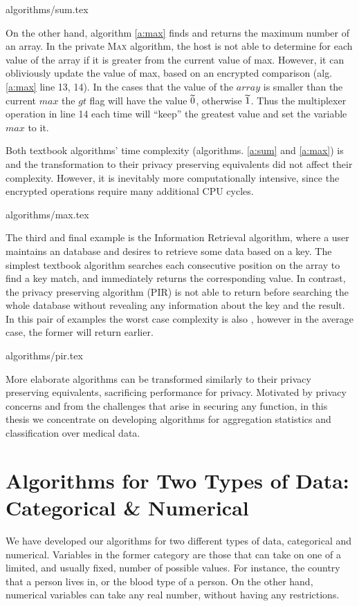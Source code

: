 {algorithms/sum.tex}


On the other hand, algorithm \ref{a:max} finds and returns the maximum number of an array.
In the private {\textsc{Max}} algorithm, the host is not able to determine for each value of the array if it is greater from the current value of max.
However, it can obliviously update the value of max, based on an encrypted comparison (alg. \ref{a:max} line 13, 14).
In the cases that the value of the $array$ is smaller than the current $max$ the $gt$ flag will have the value $\widetilde{0}$, otherwise $\widetilde{1}$.
Thus the multiplexer operation in line 14 each time will ``keep'' the greatest value and set the variable $max$ to it.

Both textbook algorithms' time complexity (algorithms. \ref{a:sum} and \ref{a:max}) is  and the transformation to their privacy preserving equivalents did not affect their complexity.
However, it is inevitably more computationally intensive, since the encrypted operations require many additional CPU cycles.

{algorithms/max.tex}


The third and final example is the Information Retrieval algorithm, where a user maintains an database and desires to retrieve some data based on a key.
The simplest textbook algorithm searches each consecutive position on the array to find a key match, and immediately returns the corresponding value.
In contrast, the privacy preserving algorithm (PIR) is not able to return before searching the whole database without revealing any information about the key and the result.
In this pair of examples the worst case complexity is also , however in the average case, the former will return earlier.


{algorithms/pir.tex}


More elaborate algorithms can be transformed similarly to their privacy preserving equivalents, sacrificing performance for privacy.
Motivated by privacy concerns and from the challenges that arise in securing any function, in this thesis we concentrate on developing algorithms for aggregation statistics and classification over medical data.




\section{Algorithms for Two Types of Data: Categorical \& Numerical}\label{s:two-types-of-data}
We have developed our algorithms for two different types of data, categorical and numerical.
Variables in the former category are those that can take on one of a limited, and usually fixed, number of possible values.
For instance, the country that a person lives in, or the blood type of a person.
On the other hand, numerical variables can take any real number, without having any restrictions.

